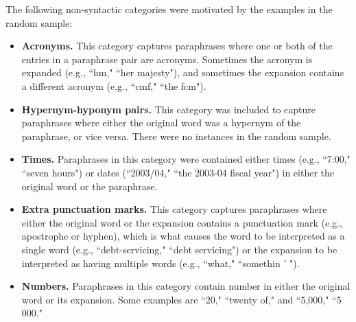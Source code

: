 \documentclass[11pt]{article}
\begin{document}
The following non-syntactic categories were motivated by the examples in the random sample:
\begin{itemize}

\item \textbf{Acronyms.} This category captures paraphrases where one or both of the entries in a paraphrase pair are acronyms. Sometimes the acronym is expanded (e.g., ``hm," ``her majesty"), and sometimes the expansion contains a different acronym (e.g., ``cmf," ``the fcm").

\item \textbf{Hypernym-hyponym pairs.} This category was included to capture paraphrases where either the original word was a hypernym of the paraphrase, or vice versa. There were no instances in the random sample.

\item \textbf{Times.} Paraphrases in this category were contained either times (e.g., ``7:00," ``seven hours") or dates (``2003/04," ``the 2003-04 fiscal year") in either the original word or the paraphrase.

\item \textbf{Extra punctuation marks.} This category captures paraphrases where either the original word or the expansion contains a punctuation mark (e.g., apostrophe or hyphen), which is what causes the word to be interpreted as a single word (e.g., ``debt-servicing," ``debt servicing") or the expansion to be interpreted as having multiple words (e.g., ``what," ``somethin ' ").

\item \textbf{Numbers.} Paraphrases in this category contain number in either the original word or its expansion. Some examples are ``20," ``twenty of," and ``5,000," ``5 000."

\end{itemize}
\end{document}
